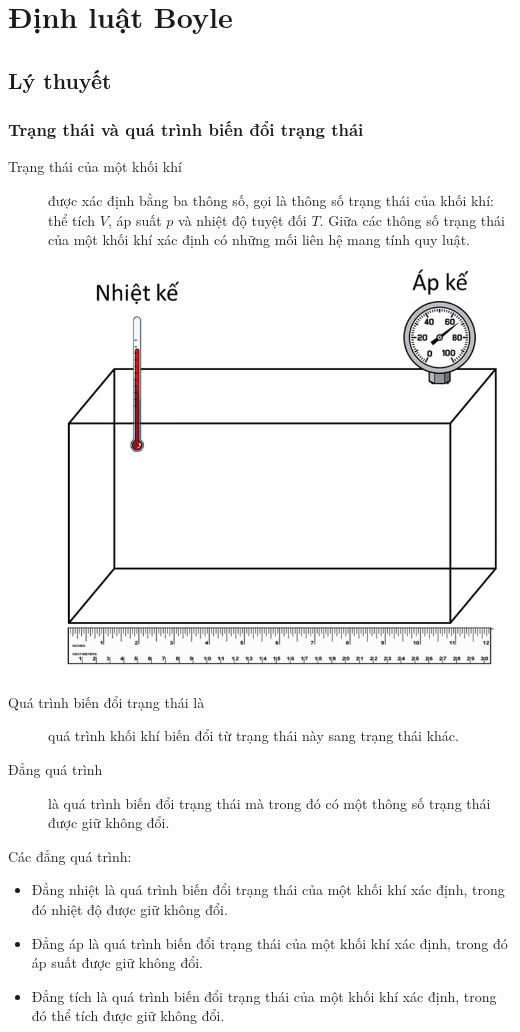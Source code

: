 \let\lesson\undefined
\newcommand{\lesson}{\phantomlesson{Bài 6: Định luật Boyle. Định luật Charles}}
\chapter[Định luật Boyle]{Định luật Boyle}
\section{Lý thuyết}
\subsection{Trạng thái và quá trình biến đổi trạng thái}
\begin{description}
	\item[Trạng thái của một khối khí] được xác định bằng ba thông số, gọi là thông số trạng thái của khối khí: thể tích $V$, áp suất $p$ và nhiệt độ tuyệt đối $T$. Giữa các thông số trạng thái của một khối khí xác định có những mối liên hệ mang tính quy luật.
	\begin{center}
		\includegraphics[width=0.35\linewidth]{../figs/VN12-Y24-PH-SYL-010-1}
	\end{center}
	\item[Quá trình biến đổi trạng thái là] quá trình khối khí biến đổi từ trạng thái này sang trạng thái khác.
	\item[Đẳng quá trình] là quá trình biến đổi trạng thái mà trong đó có một thông số trạng thái được giữ không đổi.
\end{description}
Các đẳng quá trình:
\begin{itemize}
	\item Đẳng nhiệt là quá trình biến đổi trạng thái của một khối khí xác định, trong đó nhiệt độ được giữ không đổi.
	\item Đẳng áp là quá trình biến đổi trạng thái của một khối khí xác định, trong đó áp suất được giữ không đổi.
	\item Đẳng tích là quá trình biến đổi trạng thái của một khối khí xác định, trong đó thể tích được giữ không đổi.
\end{itemize}


